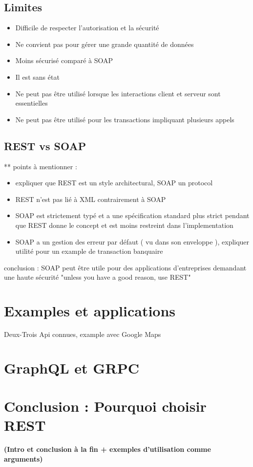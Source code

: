 \subsection{Limites}
\begin{itemize}
	\item Difficile de respecter l'autorisation et la sécurité
	\item Ne convient pas pour gérer une grande quantité de données
	\item Moins sécurisé comparé à SOAP
	\item Il est sans état
	\item Ne peut pas être utilisé lorsque les interactions client et serveur sont essentielles
	\item Ne peut pas être utilisé pour les transactions impliquant plusieurs appels
\end{itemize}
\subsection{REST vs SOAP}
** points à mentionner : 
\begin{itemize}
	\item expliquer que REST est un style architectural, SOAP un protocol
	\item REST n'est pas lié à XML contrairement à SOAP
	\item SOAP est strictement typé et a une spécification standard plus strict pendant que REST donne le concept et est moins restreint dans l'implementation 
	\item SOAP a un gestion des erreur par défaut ( vu dans son enveloppe ), expliquer utilité pour un example de transaction banquaire
\end{itemize}				 
			
conclusion : SOAP peut être utile pour des applications d'entreprises demandant une haute sécurité "unless you have a good reason, use REST" 
\section{Examples et applications}
Deux-Trois Api connues, example avec Google Maps
\section{GraphQL et GRPC}
			
\section{Conclusion : Pourquoi choisir REST}
\paragraph{(Intro et conclusion à la fin + exemples d'utilisation comme arguments)}